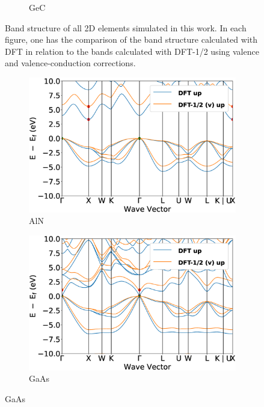 \begin{figure}[!ht]
\begin{subfigure}{0.3\textwidth}
  \caption{GeC}
\end{subfigure}\hfil %
        \caption{Band structure of all 2D elements simulated in this work. In each figure, one has the comparison of the band structure calculated with DFT in relation to the bands calculated with DFT-1/2 using valence and valence-conduction corrections.}
        \label{fig:2d_compounds_bands}
\end{figure}

\begin{figure}[!ht]
\centering %
\begin{subfigure}{0.45\textwidth}
  \includegraphics[width=\linewidth]{images/band_3d_AlN.eps}
  \caption{AlN}
\end{subfigure}\hfil %
\begin{subfigure}{0.45\textwidth}
  \includegraphics[width=\linewidth]{images/band_3d_GaAs.eps}
  \caption{GaAs}
\end{subfigure}


\end{figure}
